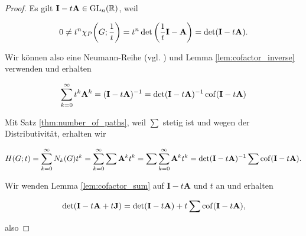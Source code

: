         \begin{proof}

            Es gilt $\mathbf I - t \mathbf A \in \operatorname{GL}_n(\mathbb R)$, weil

            \begin{align*}
                0
                \neq
                t^n \chi_P {\left ( G; \frac{1}{t} \right )}
                =
                t^n \det {\left ( \frac{1}{t} \mathbf I - \mathbf A \right )}
                =
                \det(\mathbf I - t \mathbf A).
            \end{align*}

            Wir können also eine Neumann-Reihe (vgl. \cite[Kapitel 9.3]{Ana1&2}) und Lemma \ref{lem:cofactor_inverse} verwenden und erhalten

            \begin{align*}
                \sum_{k=0}^\infty
                    t^k \mathbf A^k
                =
                (\mathbf I - t \mathbf A)^{-1}
                =
                \det(\mathbf I - t \mathbf A)^{-1} \operatorname{cof}(\mathbf I - t \mathbf A)
            \end{align*}

            Mit Satz \ref{thm:number_of_paths}, weil $\sum$ stetig ist und wegen der Distributivität, erhalten wir

            \begin{align} \label{eq:generating_function_eq_1}
                H(G; t)
                =
                \sum_{k=0}^\infty
                    N_k(G) t^k
                =
                \sum_{k=0}^\infty
                    \sum \mathbf A^k
                        t^k
                =
                \sum
                    \sum_{k=0}^\infty
                        \mathbf A^k
                        t^k
                =
                \det(\mathbf I - t \mathbf A)^{-1} \sum \operatorname{cof}(\mathbf I - t \mathbf A).
            \end{align}

            Wir wenden Lemma \ref{lem:cofactor_sum} auf $\mathbf I - t \mathbf A$ und $t$ an und erhalten

            \begin{align*}
                \det(\mathbf I - t \mathbf A + t \mathbf J)
                =
                \det(\mathbf I - t \mathbf A)
                +
                t \sum \operatorname{cof}(\mathbf I - t \mathbf A),
            \end{align*}

            also


\end{proof}
